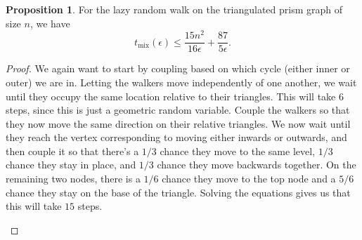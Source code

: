 \documentclass[10pt,a4paper]{amsart}
\theoremstyle{definition}
\numberwithin{definition}{section}
\newtheorem{proposition}[definition]{Proposition}
\begin{document}
\begin{proposition}\label{prop:stup}
For the lazy random walk on the triangulated prism graph of size $n$, we have 
\[ t_{\text{mix}}(\epsilon) \leq \frac{15 n^2}{16 \epsilon} + \frac{87}{5\epsilon}.\]
\end{proposition}

\begin{proof}
We again want to start by coupling based on which cycle (either inner or outer) we are in. Letting the walkers move independently of one another, we wait until they occupy the same location relative to their triangles. This will take $6$ steps, since this is just a geometric random variable. Couple the walkers so that they now move the same direction on their relative triangles. We now wait until they reach the vertex corresponding to moving either inwards or outwards, and then couple it so that there's a $1/3$ chance they move to the same level, $1/3$ chance they stay in place, and $1/3$ chance they move backwards together. On the remaining two nodes, there is a $1/6$ chance they move to the top node and a $5/6$ chance they stay on the base of the triangle. Solving the equations gives us that this will take $15$ steps. 


\begin{figure}

    \begin{center}
\end{center}


\end{figure}
\end{proof}
\end{document}
